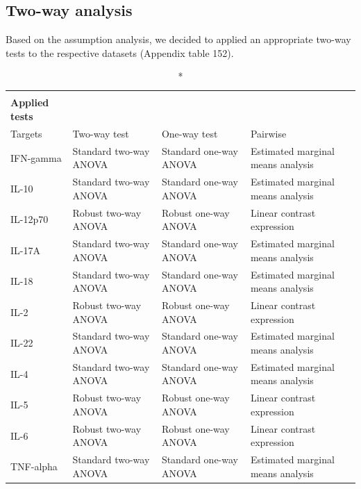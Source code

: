 \documentclass[
  12pt,
  letterpaper,
]{article}
\begin{document}
\subsection{Two-way analysis}\label{two-way-analysis-2}

Based on the assumption analysis, we decided to applied an appropriate two-way tests to the respective datasets (Appendix table 152).

\begingroup
\fontsize{12.0pt}{14.4pt}\selectfont
\begin{longtable}{l|lll}
\caption*{
{\large \textbf{Appendix Table 152}} \\ 
{\small \textbf{Applied tests}}
} \\ 
\toprule
Targets & {Two-way test} & {One-way test} & {Pairwise} \\ 
\midrule\addlinespace[2.5pt]
IFN-gamma & Standard two-way ANOVA & Standard one-way ANOVA & Estimated marginal means analysis \\ 
IL-10 & Standard two-way ANOVA & Standard one-way ANOVA & Estimated marginal means analysis \\ 
IL-12p70 & Robust two-way ANOVA & Robust one-way ANOVA & Linear contrast expression \\ 
IL-17A & Standard two-way ANOVA & Standard one-way ANOVA & Estimated marginal means analysis \\ 
IL-18 & Standard two-way ANOVA & Standard one-way ANOVA & Estimated marginal means analysis \\ 
IL-2 & Robust two-way ANOVA & Robust one-way ANOVA & Linear contrast expression \\ 
IL-22 & Standard two-way ANOVA & Standard one-way ANOVA & Estimated marginal means analysis \\ 
IL-4 & Standard two-way ANOVA & Standard one-way ANOVA & Estimated marginal means analysis \\ 
IL-5 & Robust two-way ANOVA & Robust one-way ANOVA & Linear contrast expression \\ 
IL-6 & Robust two-way ANOVA & Robust one-way ANOVA & Linear contrast expression \\ 
TNF-alpha & Standard two-way ANOVA & Standard one-way ANOVA & Estimated marginal means analysis \\ 
\bottomrule
\end{longtable}
\endgroup
\end{document}
